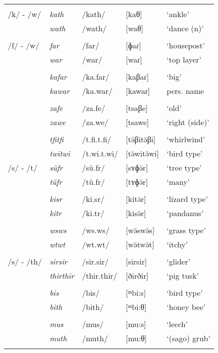 \begin{longtable}{lllll}
		&&&&\\
		/k/ - /w/ & \emph{kath} & /kath/ & [kaθ]&`ankle'\\
		& \emph{wath} & /wath/ & [waθ]&`dance (n)'\\
		&&&&\\
		/f/ - /w/ & \emph{far} & /far/ & [ɸaɾ] & `housepost'\\
		& \emph{war} & /war/ & [waɾ] & `top layer'\\
		&&&&\\
		& \emph{kafar} & /ka.far/ & [kaβaɾ] & `big'\\
		& \emph{kawar} & /ka.war/ & [kawaɾ] & pers. name\\
		&&&&\\
		& \emph{zafe} & /za.fe/ & [tsaβe] & `old'\\
		& \emph{zawe} & /za.we/ & [tsawe] & `right (side)'\\
		&&&&\\
		& \emph{tfitfi} & /t.fi.t.fi/ & [tə̆βitə̆βi] & `whirlwind'\\
		& \emph{twitwi} & /t.wi.t.wi/ & [tə̆witə̆wi] & `bird type'\\
		/s/ - /t/ & \emph{süfr} & /sü.fr/ & [sʏɸə̆r] & `tree type'\\
		& \emph{tüfr} & /tü.fr/ & [tʏɸə̆r] & `many'\\
		&&&&\\
		& \emph{kisr} & /ki.sr/ & [kitə̆r] & `lizard type'\\
		& \emph{kitr} & /ki.tr/ & [kisə̆r] & `pandanus'\\
		&&&&\\
		& \emph{wsws} & /ws.ws/ & [wə̆swə̆s] & `grass type'\\
		& \emph{wtwt} & /wt.wt/ & [wə̆twə̆t] & `itchy'\\
		&&&&\\
		/s/ - /th/ & \emph{sirsir} & /sir.sir/ & [sirsir] & `glider'\\
		& \emph{thirthir} & /thir.thir/ & [ðirðir] & `pig tusk'\\
		&&&&\\
		& \emph{bis} & /bis/ & [ᵐbi:s] & `bird type'\\
		& \emph{bith} & /bith/ & [ᵐbi:θ] & `honey bee'\\
		&&&&\\
		& \emph{mus} & /mus/ & [mu:s] & `leech'\\
		& \emph{muth} & /muth/ & [mu:θ] & `(sago) grub'\\
		&&&&\\

\end{longtable}
